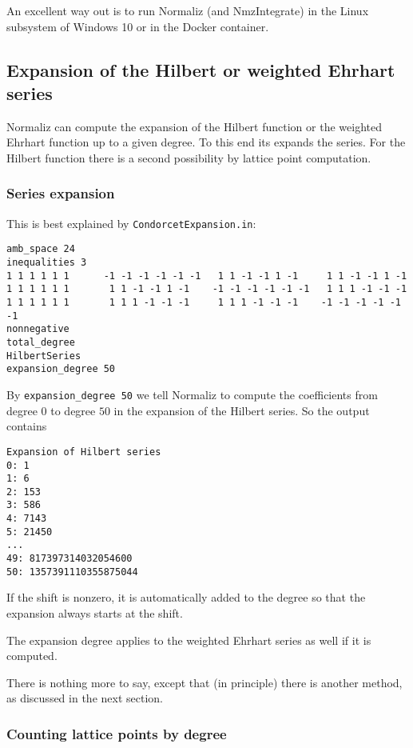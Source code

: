 \documentclass[12pt,a4paper]{scrartcl}
\theoremstyle{definition}
\begin{document}
{An excellent way out is to run Normaliz (and NmzIntegrate) in the Linux subsystem of Windows 10 or in the Docker container.

\subsection{Expansion of the Hilbert or weighted Ehrhart series}\label{expansion}

Normaliz can compute the expansion of the Hilbert function or the weighted Ehrhart function up to a given degree. To this end its expands the series. For the Hilbert function there is a second possibility by lattice point computation.

\subsubsection{Series expansion}
This is best explained by \verb|CondorcetExpansion.in|:
\begin{Verbatim}
amb_space 24
inequalities 3
1 1 1 1 1 1      -1 -1 -1 -1 -1 -1   1 1 -1 -1 1 -1     1 1 -1 -1 1 -1
1 1 1 1 1 1       1 1 -1 -1 1 -1    -1 -1 -1 -1 -1 -1   1 1 1 -1 -1 -1
1 1 1 1 1 1       1 1 1 -1 -1 -1     1 1 1 -1 -1 -1    -1 -1 -1 -1 -1 -1
nonnegative
total_degree
HilbertSeries
expansion_degree 50
\end{Verbatim}
By \verb|expansion_degree 50| we tell Normaliz to compute the coefficients from degree $0$ to degree $50$  in the expansion of the Hilbert series. So the output contains
\begin{Verbatim}
Expansion of Hilbert series
0: 1
1: 6
2: 153
3: 586
4: 7143
5: 21450
...
49: 817397314032054600
50: 1357391110355875044
\end{Verbatim}
If the shift is nonzero, it is automatically added to the degree so that the expansion always starts at the shift. 

The expansion degree applies to the weighted Ehrhart series as well if it is computed.

There is nothing more to say, except that (in principle) there is another method, as discussed in the next section.

\subsubsection{Counting lattice points by degree}\label{count}

}
\end{document}
